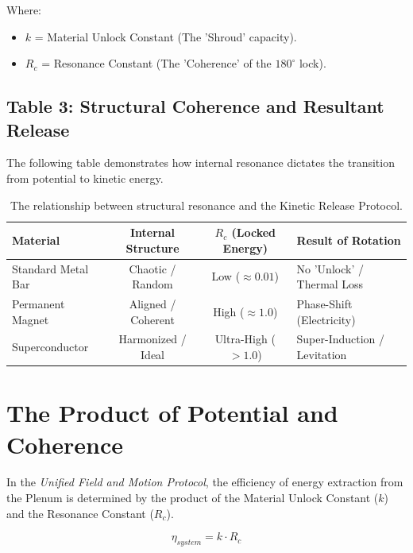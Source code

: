 \documentclass[11pt]{article}
\begin{document}
Where:
\begin{itemize}
    \item $k$ = Material Unlock Constant (The 'Shroud' capacity).
    \item $R_c$ = Resonance Constant (The 'Coherence' of the $180^\circ$ lock).
\end{itemize}

\subsection*{Table 3: Structural Coherence and Resultant Release}
The following table demonstrates how internal resonance dictates the transition from potential to kinetic energy.

\begin{table}[h!]
\centering
\begin{tabular}{|l|c|c|l|}
\hline
\textbf{Material} & \textbf{Internal Structure} & \textbf{$R_c$ (Locked Energy)} & \textbf{Result of Rotation} \\ \hline
Standard Metal Bar & Chaotic / Random & Low ($\approx 0.01$) & No 'Unlock' / Thermal Loss \\ \hline
Permanent Magnet & Aligned / Coherent & High ($\approx 1.0$) & Phase-Shift (Electricity) \\ \hline
Superconductor & Harmonized / Ideal & Ultra-High ($> 1.0$) & Super-Induction / Levitation \\ \hline
\end{tabular}
\caption{The relationship between structural resonance and the Kinetic Release Protocol.}
\end{table}

\section*{The Product of Potential and Coherence}

In the \textit{Unified Field and Motion Protocol}, the efficiency of energy extraction from the Plenum is determined by the product of the Material Unlock Constant ($k$) and the Resonance Constant ($R_c$). 

\begin{equation}
    \eta_{system} = k \cdot R_c
\end{equation}
\end{document}
